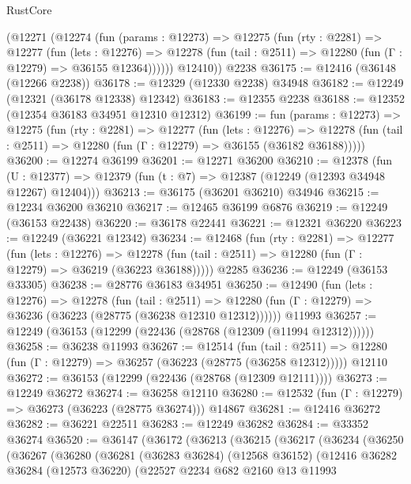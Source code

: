 \begin{lexlean}{RustCore}
\begin{coremodule}
      (@12271
        (@12274
          (fun (params : @12273) =>
          @12275
            (fun (rty : @2281) =>
            @12277
              (fun (lets : @12276) =>
              @12278 (fun (tail : @2511) => @12280 (fun (Γ : @12279) => @36155 @12364))))))
        @12410))
    @2238
@36175 := @12416 (@36148 (@12266 @2238))
@36178 := @12329 (@12330 @2238) @34948
@36182 := @12249 (@12321 (@36178 @12338) @12342)
@36183 := @12355 @2238
@36188 := @12352 (@12354 @36183 @34951 @12310 @12312)
@36199 := fun (params : @12273) =>
  @12275
    (fun (rty : @2281) =>
    @12277
      (fun (lets : @12276) =>
      @12278 (fun (tail : @2511) => @12280 (fun (Γ : @12279) => @36155 (@36182 @36188)))))
@36200 := @12274 @36199
@36201 := @12271 @36200
@36210 := @12378
    (fun (U : @12377) => @12379 (fun (t : @7) => @12387 (@12249 (@12393 @34948 @12267) @12404)))
@36213 := @36175 (@36201 @36210) @34946
@36215 := @12234 @36200 @36210
@36217 := @12465 @36199 @6876
@36219 := @12249 (@36153 @22438)
@36220 := @36178 @22441
@36221 := @12321 @36220
@36223 := @12249 (@36221 @12342)
@36234 := @12468
    (fun (rty : @2281) =>
    @12277
      (fun (lets : @12276) =>
      @12278 (fun (tail : @2511) => @12280 (fun (Γ : @12279) => @36219 (@36223 @36188)))))
    @2285
@36236 := @12249 (@36153 @33305)
@36238 := @28776 @36183 @34951
@36250 := @12490
    (fun (lets : @12276) =>
    @12278
      (fun (tail : @2511) =>
      @12280 (fun (Γ : @12279) => @36236 (@36223 (@28775 (@36238 @12310 @12312))))))
    @11993
@36257 := @12249 (@36153 (@12299 (@22436 (@28768 (@12309 (@11994 @12312))))))
@36258 := @36238 @11993
@36267 := @12514
    (fun (tail : @2511) => @12280 (fun (Γ : @12279) => @36257 (@36223 (@28775 (@36258 @12312)))))
    @12110
@36272 := @36153 (@12299 (@22436 (@28768 (@12309 @12111))))
@36273 := @12249 @36272
@36274 := @36258 @12110
@36280 := @12532 (fun (Γ : @12279) => @36273 (@36223 (@28775 @36274))) @14867
@36281 := @12416 @36272
@36282 := @36221 @22511
@36283 := @12249 @36282
@36284 := @33352 @36274
@36520 := @36147
    (@36172
      (@36213
        (@36215
          (@36217
            (@36234
              (@36250
                (@36267
                  (@36280
                    (@36281
                      (@36283 @36284)
                      (@12568 @36152)
                      (@12416
                        @36282
                        @36284
                        (@12573 @36220)
                        (@22527
                          @2234
                          @682
                          @2160
                          @13
                          @11993

\end{coremodule}
\end{lexlean}
